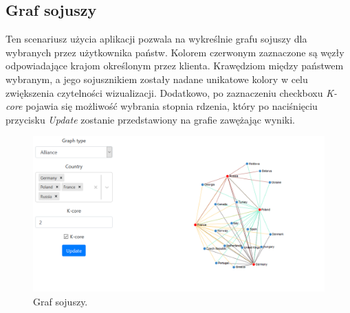 \subsection{Graf sojuszy}
Ten scenariusz użycia aplikacji pozwala na wykreślnie grafu sojuszy dla wybranych przez użytkownika państw. Kolorem czerwonym zaznaczone są węzły odpowiadające krajom określonym przez klienta. Krawędziom między państwem wybranym, a jego sojusznikiem zostały nadane unikatowe kolory w celu zwiększenia czytelności wizualizacji. Dodatkowo, po zaznaczeniu checkboxu \textit{K-core} pojawia się możliwość wybrania stopnia rdzenia, który po naciśnięciu przycisku \textit{Update} zostanie przedstawiony na grafie zawężając wyniki. 
\begin{figure}[H]
    \centering \includegraphics[width=0.8\linewidth]{tex/alliance.PNG}
    \caption{Graf sojuszy.}
    \label{fig:alliance_graph}
\end{figure}